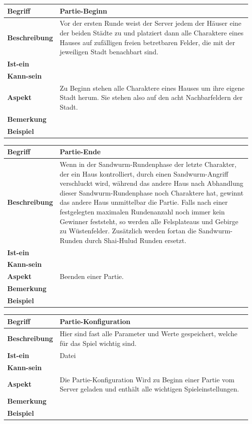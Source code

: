 \documentclass[12pt]{article}
\newcounter{fa}
\begin{document}
\begin{tabularx}{\linewidth}{|l|X|}
\hline
\textbf{Begriff} & \textbf{Partie-Beginn} \\
\hline
\textbf{Beschreibung} & Vor der ersten Runde weist der Server jedem der Häuser eine der beiden Städte zu und platziert dann alle Charaktere eines Hauses auf zufälligen freien betretbaren Felder, die mit der jeweiligen Stadt benachbart sind. \\
\hline
\textbf{Ist-ein} & \\
\hline
\textbf{Kann-sein} & \\
\hline
\textbf{Aspekt} & Zu Beginn stehen alle Charaktere eines Hauses um ihre eigene Stadt herum. Sie stehen also auf den acht Nachbarfeldern der Stadt.\\
\hline
\textbf{Bemerkung} &  \\
\hline
\textbf{Beispiel} &  \\
\hline
\end{tabularx}

\begin{tabularx}{\linewidth}{|l|X|}
\hline
\textbf{Begriff} & \textbf{Partie-Ende} \\
\hline
\textbf{Beschreibung} & Wenn in der Sandwurm-Rundenphase der letzte Charakter, der ein Haus kontrolliert, durch einen Sandwurm-Angriff verschluckt wird, während das andere Haus nach Abhandlung dieser Sandwurm-Rundenphase noch Charaktere hat, gewinnt das andere Haus unmittelbar die Partie. Falls nach einer festgelegten maximalen Rundenanzahl noch immer kein Gewinner feststeht, so werden alle Felsplateaus und Gebirge zu Wüstenfelder. Zusätzlich werden fortan die Sandwurm-Runden durch Shai-Hulud Runden ersetzt.\\
\hline
\textbf{Ist-ein} & \\
\hline
\textbf{Kann-sein} & \\
\hline
\textbf{Aspekt} & Beenden einer Partie.\\
\hline
\textbf{Bemerkung} &  \\
\hline
\textbf{Beispiel} &  \\
\hline
\end{tabularx}

\begin{tabularx}{\linewidth}{|l|X|}
\hline
\textbf{Begriff} & \textbf{Partie-Konfiguration} \\
\hline
\textbf{Beschreibung} & Hier sind fast alle Parameter und Werte gespeichert, welche für das Spiel wichtig sind. \\
\hline
\textbf{Ist-ein} & Datei \\
\hline
\textbf{Kann-sein} & \\
\hline
\textbf{Aspekt} & Die Partie-Konfiguration Wird zu Beginn einer Partie vom Server geladen und enthält alle wichtigen Spieleinstellungen.\\
\hline
\textbf{Bemerkung} &  \\
\hline
\textbf{Beispiel} &  \\
\hline
\end{tabularx}
\end{document}

